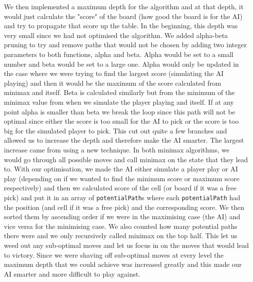 \documentclass[10pt]{article}
\begin{document}
We then implemented a maximum depth for the algorithm and at that depth, it would just calculate the "score" of the board (how good the board is for the AI) and try to propagate that score up the table. In the beginning, this depth was very small since we had not optimised the algorithm. We added alpha-beta pruning to try and remove paths that would not be chosen by adding two integer parameters to both functions, alpha and beta. Alpha would be set to a small number and beta would be set to a large one. Alpha would only be updated in the case where we were trying to find the largest score (simulating the AI playing) and then it would be the maximum of the score calculated from minimax and itself. Beta is calculated similarly but from the minimum of the minimax value from when we simulate the player playing and itself. If at any point alpha is smaller than beta we break the loop since this path will not be optimal since either the score is too small for the AI to pick or the score is too big for the simulated player to pick. This cut out quite a few branches and allowed us to increase the depth and therefore make the AI smarter. The largest increase came from using a new technique. In both minimax algorithms, we would go through all possible moves and call minimax on the state that they lead to. With our optimisation, we made the AI either simulate a player play or AI play (depending on if we wanted to find the minimum score or maximum score respectively) and then we calculated score of the cell (or board if it was a free pick) and put it in an array of {\tt{potentialPath}}s where each {\tt{potentialPath}} had the position (and cell if it was a free pick) and the corresponding score. We then sorted them by ascending order if we were in the maximising case (the AI) and vice versa for the minimising case. We also counted how many potential paths there were and we only recursively called minimax on the top half. This let us weed out any sub-optimal moves and let us focus in on the moves that would lead to victory. Since we were shaving off sub-optimal moves at every level the maximum depth that we could achieve was increased greatly and this made our AI smarter and more difficult to play against.
\end{document}
